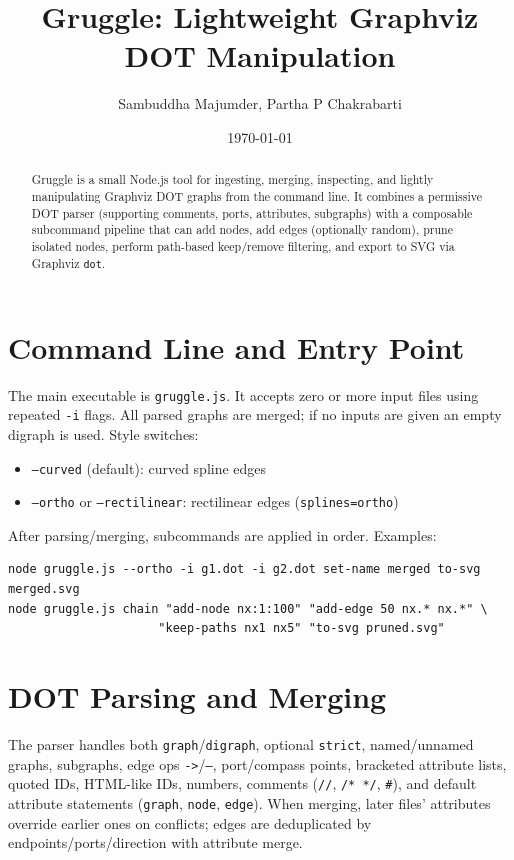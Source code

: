 \documentclass[11pt]{article}
\title{Gruggle: Lightweight Graphviz DOT Manipulation}
\author{Sambuddha Majumder, Partha P Chakrabarti}
\date{\today}
\begin{document}
\maketitle

\begin{abstract}
Gruggle is a small Node.js tool for ingesting, merging, inspecting, and
lightly manipulating Graphviz DOT graphs from the command line.
It combines a permissive DOT parser (supporting comments, ports,
attributes, subgraphs) with a composable subcommand pipeline that can
add nodes, add edges (optionally random), prune isolated nodes, perform
path-based keep/remove filtering, and export to SVG via Graphviz \texttt{dot}.
\end{abstract}

\section{Command Line and Entry Point}

The main executable is \texttt{gruggle.js}.  It accepts zero or more
input files using repeated \texttt{-i} flags.  All parsed graphs are
merged; if no inputs are given an empty digraph is used.
Style switches:
\begin{itemize}[leftmargin=*]
  \item \texttt{--curved} (default): curved spline edges
  \item \texttt{--ortho} or \texttt{--rectilinear}: rectilinear edges (\texttt{splines=ortho})
\end{itemize}
After parsing/merging, subcommands are applied in order.  Examples:
\begin{verbatim}
node gruggle.js --ortho -i g1.dot -i g2.dot set-name merged to-svg merged.svg
node gruggle.js chain "add-node nx:1:100" "add-edge 50 nx.* nx.*" \
                     "keep-paths nx1 nx5" "to-svg pruned.svg"
\end{verbatim}

\section{DOT Parsing and Merging}

The parser handles both \texttt{graph}/\texttt{digraph}, optional
\texttt{strict}, named/unnamed graphs, subgraphs, edge ops
\texttt{->}/\texttt{--}, port/compass points, bracketed attribute
lists, quoted IDs, HTML-like IDs, numbers, comments (\texttt{//},
\texttt{/* */}, \texttt{\#}), and default attribute statements
(\texttt{graph}, \texttt{node}, \texttt{edge}).  When merging, later
files' attributes override earlier ones on conflicts; edges are
deduplicated by endpoints/ports/direction with attribute merge.
\end{document}
